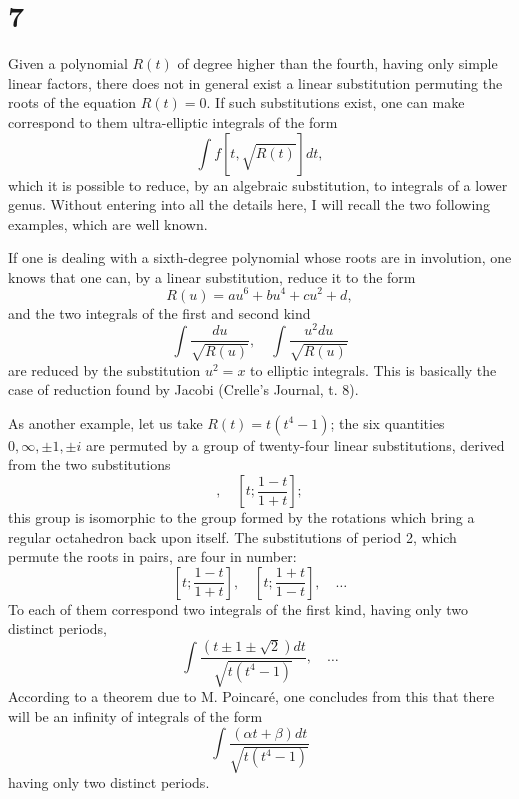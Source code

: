\documentclass[11pt]{article}
\begin{document}
\section*{7}

Given a polynomial $R(t)$ of degree higher than the fourth, having only simple linear factors, there does not in general exist a linear substitution permuting the roots of the equation $R(t)=0$. If such substitutions exist, one can make correspond to them ultra-elliptic integrals of the form
\begin{equation*}
\int f[t,\sqrt{R(t)}]dt,
\end{equation*}
which it is possible to reduce, by an algebraic substitution, to integrals of a lower genus. Without entering into all the details here, I will recall the two following examples, which are well known.

If one is dealing with a sixth-degree polynomial whose roots are in involution, one knows that one can, by a linear substitution, reduce it to the form
\begin{equation*}
R(u)=au^{6}+bu^{4}+cu^{2}+d,
\end{equation*}
and the two integrals of the first and second kind
\begin{equation*}
\int\frac{du}{\sqrt{R(u)}}, \quad \int\frac{u^2 du}{\sqrt{R(u)}}
\end{equation*}
are reduced by the substitution $u^{2}=x$ to elliptic integrals. This is basically the case of reduction found by Jacobi (Crelle's Journal, t. 8).

As another example, let us take $R(t)=t(t^{4}-1)$; the six quantities $0, \infty, \pm1, \pm i$ are permuted by a group of twenty-four linear substitutions, derived from the two substitutions
\begin{equation*}
[t;it], \quad \left[t;\frac{1-t}{1+t}\right];
\end{equation*}
this group is isomorphic to the group formed by the rotations which bring a regular octahedron back upon itself. The substitutions of period 2, which permute the roots in pairs, are four in number:
\begin{equation*}
\left[t;\frac{1-t}{1+t}\right], \quad \left[t;\frac{1+t}{1-t}\right], \quad \dots
\end{equation*}
To each of them correspond two integrals of the first kind, having only two distinct periods,
\begin{equation*}
\int\frac{(t\pm1\pm\sqrt{2})dt}{\sqrt{t(t^{4}-1)}}, \quad \dots
\end{equation*}
According to a theorem due to M. Poincaré, one concludes from this that there will be an infinity of integrals of the form
\begin{equation*}
\int\frac{(\alpha t+\beta)dt}{\sqrt{t(t^{4}-1)}}
\end{equation*}
having only two distinct periods.
\end{document}
